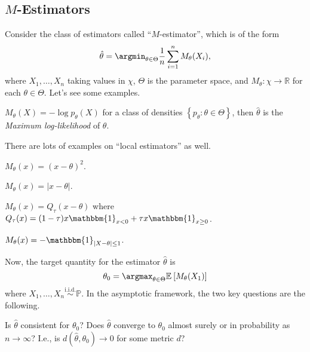 \subsection{\(M\)-Estimators}
Consider the class of estimators called ``\(M\)-estimator'', which is of the form
\[
	\hat{\theta} = \argmin_{\theta \in \Theta } \frac{1}{n} \sum_{i=1}^{n} M_\theta (X_i),
\]
where \(X_1, \dots , X_n \) taking values in \(\chi \), \(\Theta \) is the parameter space, and \(M_\theta \colon \chi \to \mathbb{R} \) for each \(\theta \in \Theta \). Let's see some examples.

\begin{eg}
	\(M_\theta (X) = - \log p_\theta (X)\) for a class of densities \(\left\{ p_\theta \colon \theta \in \Theta  \right\} \), then \(\hat{\theta} \) is the \emph{Maximum log-likelihood} of \(\theta \).
\end{eg}

There are lots of examples on ``local estimators'' as well.

\begin{eg}[Mean]
	\(M_\theta (x) = (x-\theta )^2\).
\end{eg}

\begin{eg}[Median]
	\(M_\theta (x) = \vert x - \theta  \vert\).
\end{eg}

\begin{eg}
	\(M_\theta (x) = Q_{\tau } (x - \theta )\) where \(Q_\tau (x) = (1 - \tau ) x \mathbbm{1}_{x < 0} + \tau x \mathbbm{1}_{x\geq 0} \).
\end{eg}

\begin{eg}[Mode]
	\(M_\theta (x) = - \mathbbm{1}_{\vert X - \theta  \vert \leq 1}\).
\end{eg}

Now, the target quantity for the estimator \(\hat{\theta} \) is
\[
	\theta _0 = \argmax_{\theta \in \Theta } \mathbb{E}_{}\left[M_\theta (X_1) \right]
\]
where \(X_1, \dots , X_n \overset{\text{i.i.d.} }{\sim }\mathbb{P} \). In the asymptotic framework, the two key questions are the following.

\begin{problem*}
	Is \(\hat{\theta} \) consistent for \(\theta _0\)? Does \(\hat{\theta} \) converge to \(\theta _0\) almost surely or in probability as \(n\to \infty \)? I.e., is \(d(\hat{\theta} , \theta _0)\to 0\) for some metric \(d\)?
\end{problem*}

